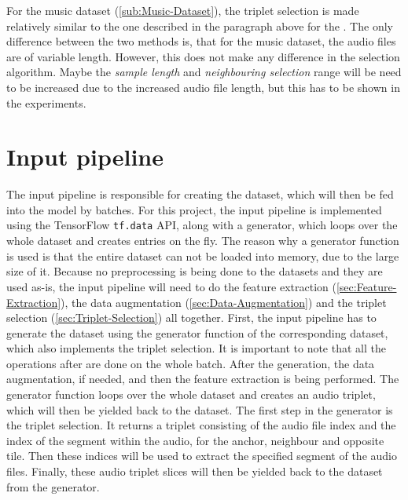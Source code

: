 \newline
\newline
For the music dataset (\ref{sub:Music-Dataset}), the triplet selection is made relatively similar to the one described in the paragraph above for the . The only difference between the two methods is, that for the music dataset, the audio files are of variable length. However, this does not make any difference in the selection algorithm. Maybe the \textit{sample length} and \textit{neighbouring selection} range will be need to be increased due to the increased audio file length, but this has to be shown in the experiments.

\section{Input pipeline}
\label{sec:Input-Pipeline}
The input pipeline is responsible for creating the dataset, which will then be fed into the model by batches. For this project, the input pipeline is implemented using the TensorFlow \texttt{tf.data} API\footnotemark, along with a generator, which loops over the whole dataset and creates entries on the fly. The reason why a generator function is used is that the entire dataset can not be loaded into memory, due to the large size of it.
\newline
\newline
Because no preprocessing is being done to the datasets and they are used as-is, the input pipeline will need to do the feature extraction (\ref{sec:Feature-Extraction}), the data augmentation (\ref{sec:Data-Augmentation}) and the triplet selection (\ref{sec:Triplet-Selection}) all together.
\newline
\newline
First, the input pipeline has to generate the dataset using the generator function of the corresponding dataset, which also implements the triplet selection. It is important to note that all the operations after are done on the whole batch. After the generation, the data augmentation, if needed, and then the feature extraction is being performed.
\newline
\newline
The generator function loops over the whole dataset and creates an audio triplet, which will then be yielded back to the dataset. The first step in the generator is the triplet selection. It returns a triplet consisting of the audio file index and the index of the segment within the audio, for the anchor, neighbour and opposite tile. Then these indices will be used to extract the specified segment of the audio files. Finally, these audio triplet slices will then be yielded back to the dataset from the generator.
